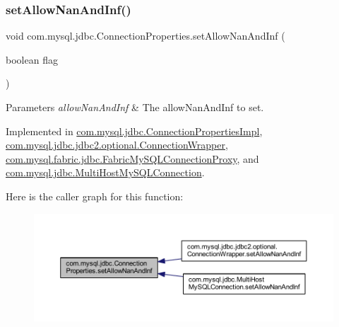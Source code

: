 \subsubsection{\texorpdfstring{set\+Allow\+Nan\+And\+Inf()}{setAllowNanAndInf()}}
{\footnotesize\ttfamily void com.\+mysql.\+jdbc.\+Connection\+Properties.\+set\+Allow\+Nan\+And\+Inf (\begin{DoxyParamCaption}\item[{boolean}]{flag }\end{DoxyParamCaption})}


\begin{DoxyParams}{Parameters}
{\em allow\+Nan\+And\+Inf} & The allow\+Nan\+And\+Inf to set. \\
\hline
\end{DoxyParams}


Implemented in \mbox{\hyperlink{classcom_1_1mysql_1_1jdbc_1_1_connection_properties_impl_ae6401b4d87aff1da9d52fb7def821df3}{com.\+mysql.\+jdbc.\+Connection\+Properties\+Impl}}, \mbox{\hyperlink{classcom_1_1mysql_1_1jdbc_1_1jdbc2_1_1optional_1_1_connection_wrapper_a3c630aa077ada90cbaf48a4653043fe5}{com.\+mysql.\+jdbc.\+jdbc2.\+optional.\+Connection\+Wrapper}}, \mbox{\hyperlink{classcom_1_1mysql_1_1fabric_1_1jdbc_1_1_fabric_my_s_q_l_connection_proxy_a11edc5442da3a1188bb18bef47772796}{com.\+mysql.\+fabric.\+jdbc.\+Fabric\+My\+S\+Q\+L\+Connection\+Proxy}}, and \mbox{\hyperlink{classcom_1_1mysql_1_1jdbc_1_1_multi_host_my_s_q_l_connection_a301b4bf7a1c4e8bdbf15cc7a977cd0b8}{com.\+mysql.\+jdbc.\+Multi\+Host\+My\+S\+Q\+L\+Connection}}.

Here is the caller graph for this function\+:\nopagebreak
\begin{figure}[H]
\begin{center}
\leavevmode
\includegraphics[width=350pt]{interfacecom_1_1mysql_1_1jdbc_1_1_connection_properties_aed2f8233f5faee7186e807c4f737b12d_icgraph}
\end{center}
\end{figure}
\mbox{\label{interfacecom_1_1mysql_1_1jdbc_1_1_connection_properties_ad7e99f72c64f4572e9952747489da7b4}} 
